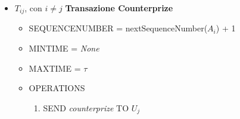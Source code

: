 \begin{itemize}
	\item $T_{ij} $, con $ i \neq j $ \textbf{Transazione Counterprize}
	      \begin{itemize}
		      \item SEQUENCE\textunderscore NUMBER = nextSequenceNumber($ A_i $) + 1
		      \item MIN\textunderscore TIME = \textit{None}
		      \item MAX\textunderscore TIME = $ \tau $
		      \item OPERATIONS
		            \begin{enumerate}
			            \item SEND \textit{counterprize} TO $ U_j $
		            \end{enumerate}
	      \end{itemize}
\end{itemize}

